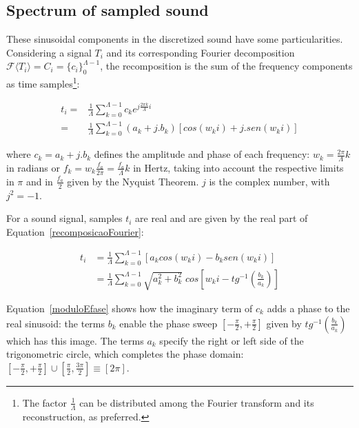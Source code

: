 
\subsection{Spectrum of sampled sound}
These sinusoidal components in the discretized sound have some particularities. Considering a signal $T_i$ and its corresponding Fourier decomposition $\mathcal{F}\langle T_i\rangle=C_i=\{c_i\}_0^{\Lambda-1}$, the recomposition is the sum of the frequency components as time samples\footnote{The factor $\frac{1}{\Lambda}$ can be distributed among the Fourier transform and its reconstruction, as preferred.}:

\begin{equation}\label{recomposicaoFourier}
\begin{split}
t_i = & \frac{1}{\Lambda}\sum_{k=0}^{\Lambda-1}c_ke^{j \frac{2\pi k}{\Lambda} i } \\ 
    = & \frac{1}{\Lambda}\sum_{k=0}^{\Lambda-1}(a_k+ j . b_k)\left[cos(w_k i)   +j . sen(w_k i)\right]
\end{split}
\end{equation}

\noindent where $c_k = a_k + j . b_k$ defines the amplitude and phase of each frequency: $w_k=\frac{2\pi}{\Lambda}k$ in radians or $f_k=w_k\frac{f_a}{2\pi}=\frac{f_a}{\Lambda}k$ in Hertz, taking into account the respective limits in $\pi$ and in $\frac{f_a}{2}$ given by the Nyquist Theorem. $j$ is the complex number, with $j^2=-1$.

For a sound signal, samples $t_i$ are real and are given by the real part of Equation~\ref{recomposicaoFourier}:

\begin{equation}\label{moduloEfase}
\begin{split}
t_i& = \frac{1}{\Lambda}\sum_{k=0}^{\Lambda-1}\left[a_k cos(w_k i) -b_k sen(w_k i)\right] \\
   & = \frac{1}{\Lambda}\sum_{k=0}^{\Lambda-1}\sqrt{a_k^2 + b_k^2} \; cos\left[w_k i - tg^{-1}\left(\frac{b_k}{a_k}\right)\right]
\end{split}
\end{equation}

Equation~\ref{moduloEfase} shows how the imaginary term of $c_k$ adds a phase to the real sinusoid: the terms $b_k$ enable the phase sweep $\left[-\frac{\pi}{2},+\frac{\pi}{2}\right]$ given by $tg^{-1}\left(\frac{b_k}{a_k}\right)$ which has this image. The terms $a_k$ specify the right or left side of the trigonometric circle, which completes the phase domain: $\left[-\frac{\pi}{2},+\frac{\pi}{2}\right] \cup \left[\frac{\pi}{2},\frac{3\pi}{2}\right]\equiv [2\pi]$.

